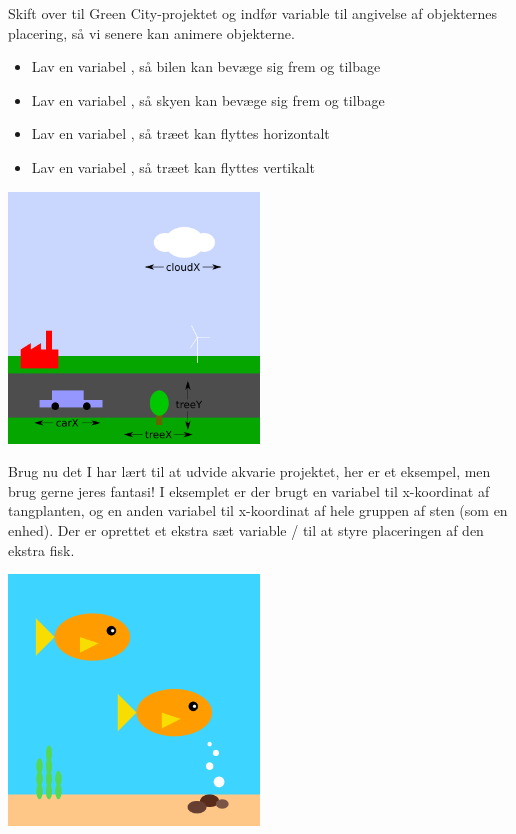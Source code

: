 \documentclass{ucph-handout}
\begin{document}
\begin{exercisebox}[adjusted title=Green City fortsat]
Skift over til Green City-projektet og indfør variable til angivelse af
objekternes placering, så vi senere kan animere objekterne.

\begin{itemize}
\item Lav en variabel , så bilen kan bevæge sig frem
  og tilbage
\item Lav en variabel , så skyen kan bevæge sig frem og tilbage
\item Lav en variabel , så træet kan flyttes horizontalt
\item Lav en variabel , så træet kan flyttes vertikalt
\end{itemize}

\hspace{1cm}
\begin{center}
\includegraphics[width=0.5\textwidth]{../illustrations/images/carX-cloudX-treeXY.png}
\end{center}
\end{exercisebox}
\begin{exercisebox}[adjusted title=Akvarie fortsat]
Brug nu det I har lært til at udvide akvarie projektet, her er et
eksempel, men brug gerne jeres fantasi! I eksemplet er der brugt en
variabel til x-koordinat af tangplanten, og en anden variabel til
x-koordinat af hele gruppen af sten (som en enhed). Der er oprettet et
ekstra sæt variable / til at styre
placeringen af den ekstra fisk.
\begin{center}
\includegraphics[width=0.5\textwidth]{../illustrations/images/akvarie.png}
\end{center}
\end{exercisebox}
\end{document}
